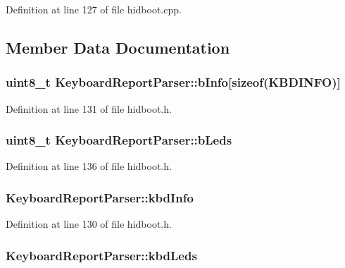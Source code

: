 \-Definition at line 127 of file hidboot.\-cpp.



\subsection{\-Member \-Data \-Documentation}
\hypertarget{class_keyboard_report_parser_a65e6da24b038be3095d06e13b4a280ba}{
\subsubsection[{b\-Info}]{\setlength{\rightskip}{0pt plus 5cm}uint8\-\_\-t {\bf \-Keyboard\-Report\-Parser\-::b\-Info}\mbox{[}sizeof({\bf \-K\-B\-D\-I\-N\-F\-O})\mbox{]}}}\label{class_keyboard_report_parser_a65e6da24b038be3095d06e13b4a280ba}


\-Definition at line 131 of file hidboot.\-h.

\hypertarget{class_keyboard_report_parser_ae910089ecc7caff18429925affc5dc7f}{
\subsubsection[{b\-Leds}]{\setlength{\rightskip}{0pt plus 5cm}uint8\-\_\-t {\bf \-Keyboard\-Report\-Parser\-::b\-Leds}}}\label{class_keyboard_report_parser_ae910089ecc7caff18429925affc5dc7f}


\-Definition at line 136 of file hidboot.\-h.

\hypertarget{class_keyboard_report_parser_ab62ffa0e72677379d1e68538625f2f28}{
\subsubsection[{kbd\-Info}]{ {\bf \-Keyboard\-Report\-Parser\-::kbd\-Info}}}\label{class_keyboard_report_parser_ab62ffa0e72677379d1e68538625f2f28}


\-Definition at line 130 of file hidboot.\-h.

\hypertarget{class_keyboard_report_parser_aa867ab4b6898efa9b768bd05f275809c}{
\subsubsection[{kbd\-Leds}]{ {\bf \-Keyboard\-Report\-Parser\-::kbd\-Leds}}}\label{class_keyboard_report_parser_aa867ab4b6898efa9b768bd05f275809c}


